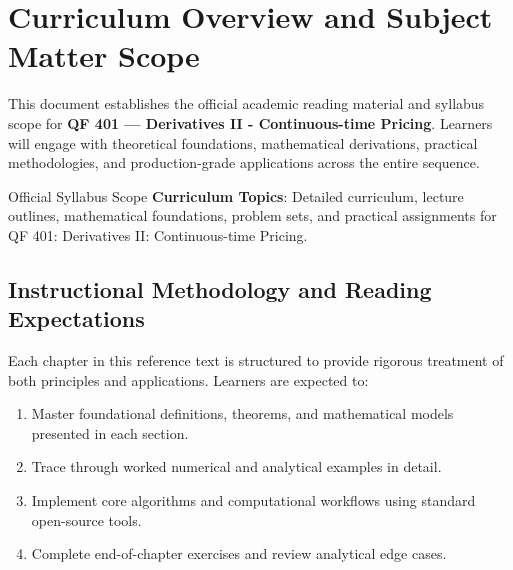 \section{Curriculum Overview and Subject Matter Scope}

This document establishes the official academic reading material and syllabus scope for \textbf{QF 401 --- Derivatives II - Continuous-time Pricing}. Learners will engage with theoretical foundations, mathematical derivations, practical methodologies, and production-grade applications across the entire sequence.

\begin{InsightBox}{Official Syllabus Scope}
  \textbf{Curriculum Topics}: Detailed curriculum, lecture outlines, mathematical foundations, problem sets, and practical assignments for QF 401: Derivatives II: Continuous-time Pricing.
\end{InsightBox}

\subsection{Instructional Methodology and Reading Expectations}

Each chapter in this reference text is structured to provide rigorous treatment of both principles and applications. Learners are expected to:
\begin{enumerate}
  \item Master foundational definitions, theorems, and mathematical models presented in each section.
  \item Trace through worked numerical and analytical examples in detail.
  \item Implement core algorithms and computational workflows using standard open-source tools.
  \item Complete end-of-chapter exercises and review analytical edge cases.
\end{enumerate}

